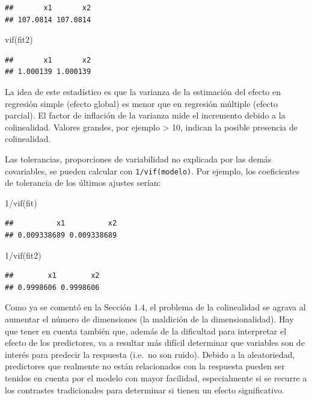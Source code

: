 \documentclass[
]{book}
\newenvironment{Shaded}{\begin{snugshade}}{\end{snugshade}}
\newcommand{\DecValTok}[1]{\textcolor[rgb]{0.00,0.00,0.81}{#1}}
\newcommand{\FunctionTok}[1]{\textcolor[rgb]{0.00,0.00,0.00}{#1}}
\newcommand{\NormalTok}[1]{#1}
\newcommand{\SpecialCharTok}[1]{\textcolor[rgb]{0.00,0.00,0.00}{#1}}
\theoremstyle{break}
\theoremstyle{definition}
\theoremstyle{definition}
\theoremstyle{definition}
\theoremstyle{definition}
\theoremstyle{remark}
\begin{document}
\begin{verbatim}
##       x1       x2 
## 107.0814 107.0814
\end{verbatim}

\begin{Shaded}
\begin{Highlighting}[]
\FunctionTok{vif}\NormalTok{(fit2) }
\end{Highlighting}
\end{Shaded}

\begin{verbatim}
##       x1       x2 
## 1.000139 1.000139
\end{verbatim}

La idea de este estadístico es que la varianza de la estimación del efecto en
regresión simple (efecto global) es menor que en regresión múltiple (efecto parcial).
El factor de inflación de la varianza mide el incremento debido a la colinealidad.
Valores grandes, por ejemplo \textgreater{} 10, indican la posible presencia de colinealidad.

Las tolerancias, proporciones de variabilidad no explicada por las demás covariables, se pueden calcular con \texttt{1/vif(modelo)}.
Por ejemplo, los coeficientes de tolerancia de los últimos ajustes serían:

\begin{Shaded}
\begin{Highlighting}[]
\DecValTok{1}\SpecialCharTok{/}\FunctionTok{vif}\NormalTok{(fit)}
\end{Highlighting}
\end{Shaded}

\begin{verbatim}
##          x1          x2 
## 0.009338689 0.009338689
\end{verbatim}

\begin{Shaded}
\begin{Highlighting}[]
\DecValTok{1}\SpecialCharTok{/}\FunctionTok{vif}\NormalTok{(fit2) }
\end{Highlighting}
\end{Shaded}

\begin{verbatim}
##        x1        x2 
## 0.9998606 0.9998606
\end{verbatim}

Como ya se comentó en la Sección 1.4, el problema de la colinealidad se agrava al aumentar el número de dimensiones (la maldición de la dimensionalidad).
Hay que tener en cuenta también que, además de la dificultad para interpretar el efecto de los predictores, va a resultar más difícil determinar que variables son de interés para predecir la respuesta (i.e.~no son ruido). Debido a la aleatoriedad, predictores que realmente no están relacionados con la respuesta pueden ser tenidos en cuenta por el modelo con mayor facilidad, especialmente si se recurre a los contrastes tradicionales para determinar si tienen un efecto significativo.
\end{document}
